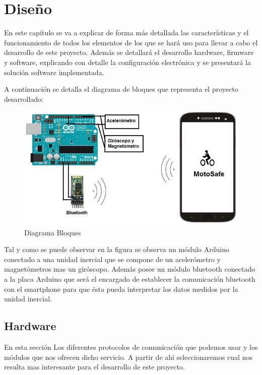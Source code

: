 	\chapter{Dise\~no}\label{cap.desarrollo}
	
	En este capítulo se va a explicar de forma más detallada las características y el funcionamiento de todos los elementos de los que se hará uso para llevar a cabo el desarrollo de este proyecto. Además se detallará el desarrollo hardware, firmware y software, explicando con detalle la configuración electrónica y se presentará la solución software implementada.
	
	A continuación se detalla el diagrama de bloques que representa el proyecto desarrollado:
	
	\begin{figure}[h]
		\centering
		\includegraphics{imagenes/DiagramaBloques.jpg}
		\caption{Diagrama Bloques}
		\label{contexto:figura}
	\end{figure}
	
	Tal y como se puede observar en la figura se observa un módulo Arduino conectado a una unidad inercial que se compone de un acelerómetro y magnetómetros mas un giróscopo. Además posee un módulo bluetooth conectado a la placa Arduino que será el encargado de establecer la comunicación bluetooth con el smartphone para que ésta pueda interpretar los datos medidos por la unidad inercial.
	
	
	\section{Hardware}
	
		En esta sección Los diferentes protocolos de comunicación que podemos usar y los módulos que nos ofrecen dicho servicio. A partir de ahí seleccionaremos cual nos resulta mas interesante para el desarrollo de este proyecto.
		
